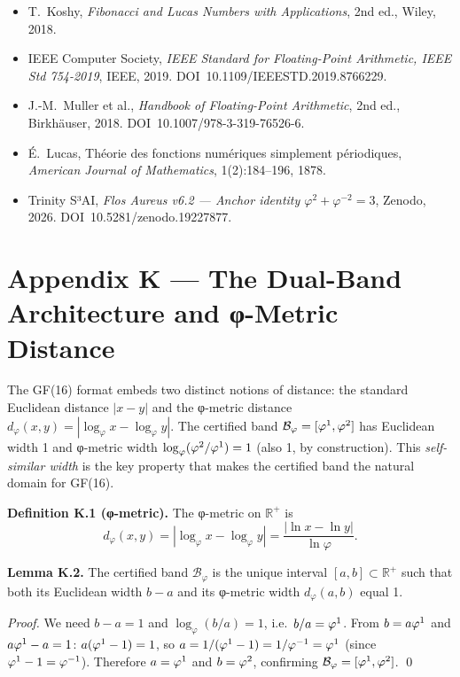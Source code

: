 \begin{itemize}
  \item \cite{koshy_fib_lucas} T.\ Koshy,
    \emph{Fibonacci and Lucas Numbers with Applications}, 2nd ed.,
    Wiley, 2018.
  \item \cite{ieee754_2019} IEEE Computer Society,
    \emph{IEEE Standard for Floating-Point Arithmetic, IEEE Std 754-2019},
    IEEE, 2019.  DOI~10.1109/IEEESTD.2019.8766229.
  \item \cite{muller_fp_handbook} J.-M.\ Muller et al.,
    \emph{Handbook of Floating-Point Arithmetic}, 2nd ed.,
    Birkhäuser, 2018.  DOI~10.1007/978-3-319-76526-6.
  \item \cite{lucas1878} É.\ Lucas,
    Théorie des fonctions numériques simplement périodiques,
    \emph{American Journal of Mathematics}, 1(2):184--196, 1878.
  \item \cite{zenodo_trinity_anchor}
    Trinity S³AI,
    \emph{Flos Aureus v6.2 — Anchor identity
    \(\varphi^2+\varphi^{-2}=3\)},
    Zenodo, 2026.
    DOI~10.5281/zenodo.19227877.
\end{itemize}

\section{Appendix K — The Dual-Band Architecture and φ-Metric Distance}
\label{sec:appendix-k}

The GF(16) format embeds two distinct notions of distance: the
standard Euclidean distance \(|x - y|\) and the φ-metric distance
\(d_\varphi(x, y) = |\log_\varphi x - \log_\varphi y|\).  The
certified band \(\mathcal{B}_\varphi = [\varphi^{1}, \varphi^{2}]\)
has Euclidean width 1 and φ-metric width
\(\log_\varphi(\varphi^{2}/\varphi^{1}) = 1\) (also 1, by construction).
This \emph{self-similar width} is the key property that makes
the certified band the natural domain for GF(16).

\textbf{Definition K.1 (φ-metric).}
The φ-metric on \(\mathbb{R}^+\) is
\[
  d_\varphi(x, y) = |\log_\varphi x - \log_\varphi y|
  = \frac{|\ln x - \ln y|}{\ln \varphi}.
\]

\textbf{Lemma K.2.}
The certified band \(\mathcal{B}_\varphi\) is the unique interval
\([a, b] \subset \mathbb{R}^+\) such that both its Euclidean width
\(b - a\) and its φ-metric width \(d_\varphi(a, b)\) equal 1.

\begin{proof}
We need \(b - a = 1\) and \(\log_\varphi(b/a) = 1\), i.e.\ \(b/a =
\varphi^{1}\).  From \(b = a\varphi^{1}\) and \(a\varphi^{1} - a = 1\):
\(a(\varphi^{1}-1) = 1\), so \(a = 1/(\varphi^{1}-1) = 1/\varphi^{-1} =
\varphi^{1}\) (since \(\varphi^{1}-1 = \varphi^{-1}\)).
Therefore \(a = \varphi^{1}\) and \(b = \varphi^{2}\),
confirming \(\mathcal{B}_\varphi = [\varphi^{1},\varphi^{2}]\).
\qed
\end{proof}

